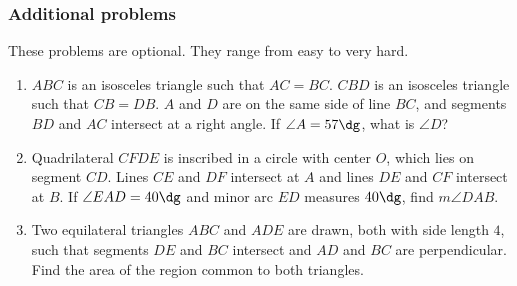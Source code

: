 \documentclass[10pt,paper=letter]{scrartcl}
\begin{document}
\subsubsection*{Additional problems}

These problems are optional. They range from easy to very hard.

\begin{enumerate}
  \item $ABC$ is an isosceles triangle such that $AC = BC$. $CBD$ is an isosceles triangle such that $CB = DB$. $A$ and $D$ are on the same side of line $BC$, and segments $BD$ and $AC$ intersect at a right angle. If $\angle A = 57\dg$, what is $\angle D$?

  \item Quadrilateral $CFDE$ is inscribed in a circle with center $O$, which lies on segment $CD$. Lines $CE$ and $DF$ intersect at $A$ and lines $DE$ and $CF$ intersect at $B$. If $\angle EAD = 40\dg$ and minor arc $ED$ measures $40\dg$, find $m\angle DAB$.

  \item Two equilateral triangles $ABC$ and $ADE$ are drawn, both with side length $4$, such that segments $DE$ and $BC$ intersect and $AD$ and $BC$ are perpendicular. Find the area of the region common to both triangles.
\end{enumerate}
\end{document}
